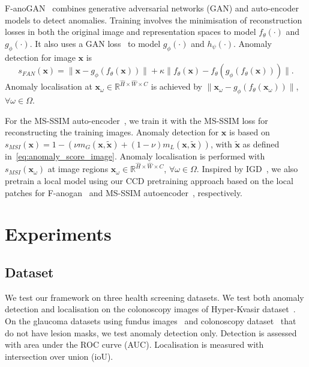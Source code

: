 \documentclass[runningheads]{llncs}
\begin{document}
F-anoGAN~\cite{F-anoGAN} combines generative adversarial networks (GAN) and auto-encoder models to detect anomalies. Training involves the minimisation of reconstruction losses in both the original image and representation spaces to model $f_{\theta}(\cdot)$ and $g_{\phi}(\cdot)$. It also uses a GAN loss~\cite{goodfellow2014generative} to model $g_{\phi}(\cdot)$ and $h_{\psi}(\cdot)$.  
Anomaly detection for image $\mathbf{x}$ is 
\begin{equation}
    s_{FAN}(\mathbf{x})= \| \mathbf{x} - g_{\phi}(f_{\theta}(\mathbf{x})) \| + \kappa\| f_{\theta}(\mathbf{x})-f_{\theta}(g_{\phi}(f_{\theta}(\mathbf{x})))  \|.
\end{equation}
Anomaly localisation at $\mathbf{x}_{\omega} \in \mathbb{R}^{\hat{H} \times \hat{W} \times C}$ is achieved by $\| \mathbf{x}_{\omega} - g_{\phi}(f_{\theta}(\mathbf{x}_{\omega})) \|$, $\forall \omega \in \Omega$. 


 For the MS-SSIM auto-encoder~\cite{wang2003multiscale}, we train it with the MS-SSIM loss for reconstructing the training images. 
Anomaly detection for $\mathbf{x}$ is based on  $s_{MSI}(\mathbf{x})=1-\left( 
 \nu m_{G}(\mathbf{x},\tilde{\mathbf{x}}) + (1-\nu)m_{L}(\mathbf{x},\tilde{\mathbf{x}}) \right )$, with $\tilde{\mathbf{x}}$ as defined in~\eqref{eq:anomaly_score_image}. Anomaly localisation is performed with $s_{MSI}(\mathbf{x}_{\omega})$ at image regions $\mathbf{x}_{\omega} \in \mathbb{R}^{\hat{H} \times \hat{W} \times C}$, $\forall \omega \in \Omega$. Inspired by IGD~\cite{chen2021unsupervised}, we also pretrain a local model using our CCD pretraining approach based on the local patches for F-anogan~\cite{F-anoGAN} and MS-SSIM autoencoder~\cite{wang2003multiscale}, respectively. 
 
 






\section{Experiments}



\subsection{Dataset}

We test our framework on three health screening datasets. We test both anomaly detection and localisation on the colonoscopy images of Hyper-Kvasir dataset~\cite{borgli2020hyperkvasir}.
On the glaucoma datasets using fundus images~\cite{li2019attention} and colonoscopy dataset~\cite{liu2019photoshopping} that do not have lesion masks, we test anomaly detection only.
Detection is assessed with area under the ROC curve (AUC). Localisation is measured with intersection over union (ioU).
\end{document}
